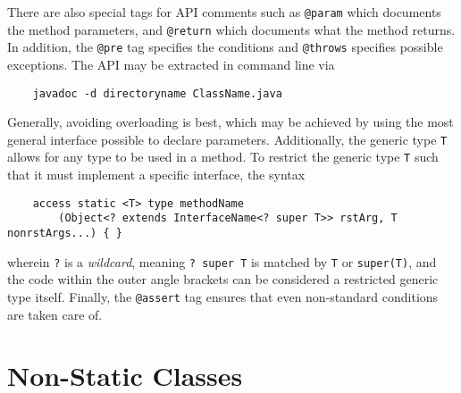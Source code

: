 \documentclass[letterpaper, openany, justified]{tufte-book}
\newcommand{\cd}[1]{\lstinline{#1}}
\begin{document}
\begin{fullwidth}
\bigskip
There are also special tags for API comments such as \cd{@param} which documents the method parameters, and \cd{@return} which documents what the method returns. In addition, the \cd{@pre} tag specifies the conditions and \cd{@throws} specifies possible exceptions. The API may be extracted in command line via
\begin{lstlisting}
    javadoc -d directoryname ClassName.java
\end{lstlisting}
Generally, avoiding overloading is best, which may be achieved by using the most general interface possible to declare parameters. Additionally, the generic type \cd{T} allows for any type to be used in a method. To restrict the generic type \cd{T} such that it must implement a specific interface, the syntax
\begin{lstlisting}
    access static <T> type methodName
        (Object<? extends InterfaceName<? super T>> rstArg, T nonrstArgs...) { }
\end{lstlisting}
wherein \cd{?} is a \emph{wildcard}, meaning \cd{? super T} is matched by \cd{T} or \cd{super(T)}, and the code within the outer angle brackets can be considered a restricted generic type itself. Finally, the \cd{@assert} tag ensures that even non-standard conditions are taken care of.

\chapter{Non-Static Classes}


\end{fullwidth}
\end{document}
